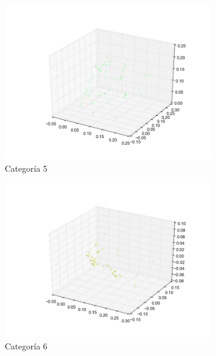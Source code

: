 \begin{figure}[H]
\begin{subfigure}[b]{0.33\textwidth}
        \end{subfigure}
        \begin{subfigure}[b]{0.33\textwidth}
                \includegraphics[width=\linewidth]{secciones/graficos/oja/categoria_5.png}
                \caption{Categoría 5}
                \label{fig: ej1_oja_categoria_5}
        \end{subfigure}
        \begin{subfigure}[b]{0.33\textwidth}
                \includegraphics[width=\linewidth]{secciones/graficos/oja/categoria_6.png}
                \caption{Categoría 6}
                \label{fig: ej1_oja_categoria_6}
        \end{subfigure}
        \begin{subfigure}[b]{0.33\textwidth}

\end{subfigure}
\end{figure}

